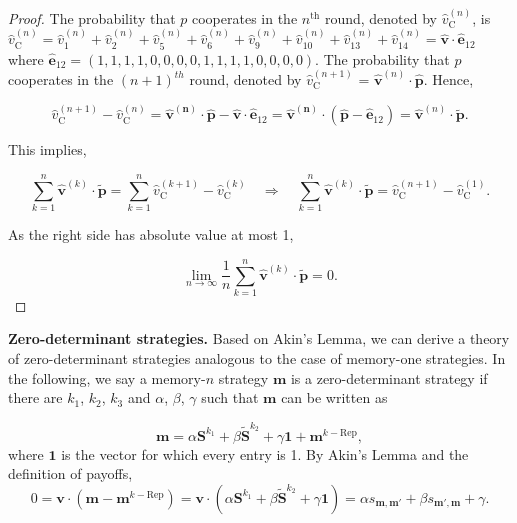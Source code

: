 \documentclass{article}
\theoremstyle{definition}
\begin{document}
\begin{proof}
  The probability that \(p\) cooperates in the \(n^{\text{th}}\) round, denoted
  by \(\hat{v}_{\text{C}}^{(n)}\), is \(\hat{v}_{\text{C}}^{(n)} = \hat{v}_{1}^{(n)} +
  \hat{v}_{2}^{(n)} + \hat{v}_{5}^{(n)} + \hat{v}_{6}^{(n)} + \hat{v}_{9}^{(n)} +  \hat{v}_{10}^{(n)} +
  \hat{v}_{13}^{(n)} + \hat{v}_{14}^{(n)} = \mathbf{\hat{v}} \cdot \mathbf{\hat{e}}_{1 2}\)
  where \(\mathbf{\hat{e}}_{1 2} = (1, 1, 1, 1, \allowbreak 0,
  0, 0, 0, 1, 1, 1, 1, 0, 0, 0, 0)\). The probability that \(p\) cooperates in the \((n + 1)^{th}\) round, denoted
  by \(\hat{v}_{\text{C}}^{(n + 1)}\) = \(\mathbf{\hat{v}}^{(n)} \cdot \mathbf{\hat{p}}\).
  Hence,

  \begin{equation*}
   \hat{v}_{\text{C}}^{(n + 1)} - \hat{v}_{\text{C}}^{(n)} = \mathbf{\hat{v}^{(n)}} \cdot \mathbf{\hat{p}} - \mathbf{\hat{v}} \cdot \mathbf{\hat{e}}_{1 2}
    = \mathbf{\hat{v}^{(n)}} \cdot (\mathbf{\hat{p}} - \mathbf{\hat{e}}_{1 2}) = \mathbf{\hat{v}}^{(n)} \cdot \mathbf{\tilde{p}}.
  \end{equation*}

  This implies,

  \begin{equation}
    \sum^{n}_{k=1} \mathbf{\hat{v}}^{(k)} \cdot \mathbf{\tilde{p}} = \sum^{n}_{k=1} \hat{v}_{\text{C}}^{(k + 1)} - \hat{v}_{\text{C}}^{(k)} \quad \Rightarrow \quad \sum^{n}_{k=1} \mathbf{\hat{v}}^{(k)} \cdot \mathbf{\tilde{p}} =  \hat{v}_{\text{C}}^{(n + 1)} - \hat{v}_{\text{C}}^{(1)}.
   \end{equation}

   As the right side has absolute value at most 1,

   \begin{equation}
    \lim_{n \rightarrow \infty} \frac{1}{n} \sum^{n}_{k=1} \mathbf{\hat{v}}^{(k)} \cdot \mathbf{\tilde{p}} = 0. 
   \end{equation}

\end{proof}

\noindent
{\bf Zero-determinant strategies.}
Based on Akin's Lemma, we can derive a theory of zero-determinant strategies
analogous to the case of memory-one strategies. In the following, we say a
memory-$n$ strategy $\mathbf{m}$ is a zero-determinant strategy if there are
$k_1$, $k_2$, $k_3$ and $\alpha$, $\beta$, $\gamma$ such that $\mathbf{m}$ can
be written as

\begin{equation} \label{Eq:DefZD}
\mathbf{m} = \alpha \mathbf{S}^{k_1} + \beta \mathbf{\tilde{S}}^{k_2} + \gamma \mathbf{1} + \mathbf{m}^{k-\text{Rep}},  
\end{equation} 
where $\mathbf{1}$ is the vector for which every entry is 1. By Akin's Lemma and the definition of payoffs,
\begin{equation} \label{Eq:PayoffZD}
0 = \mathbf{v} \cdot  (\mathbf{m} - \mathbf{m}^{k-\text{Rep}}) = \mathbf{v} \cdot (\alpha \mathbf{S}^{k_1} + \beta \mathbf{\tilde{S}}^{k_2} + \gamma \mathbf{1} ) = \alpha s_{\mathbf{m}, \mathbf{m'}} + \beta s_{\mathbf{m'}, \mathbf{m}} + \gamma. 
\end{equation}
\end{document}
